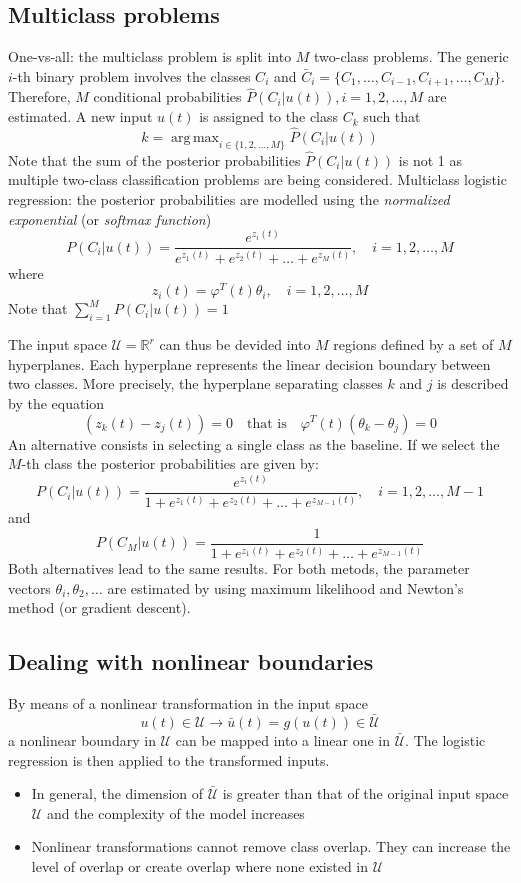 \documentclass{book}
\DeclareMathOperator*{\argmax}{arg\,max}
\begin{document}
\subsection{Multiclass problems}
One-vs-all: the multiclass problem is split into $M$ two-class problems. The generic $i$-th binary problem involves the classes $C_i$ and $\bar{C}_i = \{C_1,\dots,C_{i-1},C_{i+1},\dots,C_M\}$. Therefore, $M$ conditional probabilities $\hat{P}(C_i|u(t)),i=1,2,\dots,M$ are estimated. A new input $u(t)$ is assigned to the class $C_k$ such that 
\[
    k = \argmax_{i\in \{1,2,\dots,M\}}\hat{P}(C_i|u(t))
\]
Note that the sum of the posterior probabilities $\hat{P}(C_i|u(t))$ is not 1 as multiple two-class classification problems are being considered.
Multiclass logistic regression: the posterior probabilities are modelled using the \emph{normalized exponential} (or \emph{softmax function})
\[
    P(C_i|u(t))=\displaystyle\frac{e^{z_i(t)}}{e^{z_1(t)}+e^{z_2(t)}+\dots+e^{z_M(t)}}, \quad i=1,2,\dots,M
\]
where 
\[
    z_i(t)=\varphi^T(t)\theta_i, \quad i=1,2,\dots,M
\]
Note that $\sum_{i=1}^{M}P(C_i|u(t))=1$

The input space $\mathcal{U}=\mathbb{R}^r$ can thus be devided into $M$ regions defined by a set of $M$ hyperplanes. Each hyperplane represents the linear decision boundary between two classes. More precisely, the hyperplane separating classes $k$ and $j$ is described by the equation 
\[
    (z_k(t)-z_j(t)) = 0 \quad \text{that is} \quad \varphi^T(t)(\theta_k-\theta_j)=0
\]
An alternative consists in selecting a single class as the baseline. If we select the $M$-th class the posterior probabilities are given by:
\[
    P(C_i|u(t)) = \displaystyle\frac{e^{z_i(t)}}{1+e^{z_1(t)}+e^{z_2(t)}+\dots+e^{z_{M-1}(t)}}, \quad i=1,2,\dots, M-1
\]
and
\[
    P(C_M|u(t)) = \displaystyle\frac{1}{1+e^{z_1(t)}+e^{z_2(t)}+\dots+e^{z_{M-1}(t)}}
\]
Both alternatives lead to the same results. For both metods, the parameter vectors $\theta_i,\theta_2,\dots$ are estimated by using maximum likelihood and Newton's method (or gradient descent).
\subsection{Dealing with nonlinear boundaries}
By means of a nonlinear transformation in the input space
\[
    u(t)\in\mathcal{U}\rightarrow \bar{u}(t)=g(u(t))\in\bar{\mathcal{U}}
\]
a nonlinear boundary in $\mathcal{U}$ can be mapped into a linear one in $\bar{\mathcal{U}}$. The logistic regression is then applied to the transformed inputs. 
\begin{itemize}
    \item In general, the dimension of $\bar{\mathcal{U}}$ is greater than that of the original input space $\mathcal{U}$ and the complexity of the model increases 
    \item Nonlinear transformations cannot remove class overlap. They can increase the level of overlap or create overlap where none existed in $\mathcal{U}$
\end{itemize}
\end{document}
